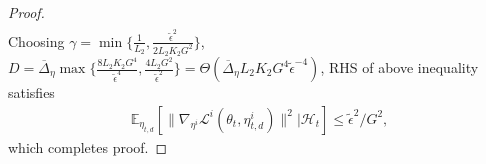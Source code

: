 \documentclass[twoside]{article} %
\theoremstyle{plain}
\theoremstyle{definition}
\theoremstyle{remark}
\newcommand{\tepsilon}{\tilde{\epsilon}}
\newcommand{\fL}{\mathcal{L}}
\newcommand{\calH}{\mathcal{H}}
\begin{document}
\begin{proof}
\begin{align}
\end{align}
Choosing $\gamma = \min\{\frac{1}{L_2},\frac{\tilde\epsilon^2}{2L_2K_2G^2}\}$, $D = \overline{\Delta}_{\eta}\max\{\frac{8L_2K_2G^4}{\tepsilon^{4}},\frac{4L_2G^2}{\tepsilon^2} \} = \Theta(\overline{\Delta}_{\eta}L_2K_2G^4\tepsilon^{-4})$, RHS of above inequality satisfies 
\begin{align}
\mathbb{E}_{\eta_{t,d}}[\|\nabla_{\eta^i} \fL^i({\theta}_t, {\eta}^i_{t,{d}}) \|^2|\calH_t]\leq {{\tepsilon^2}/{G^2}},
\end{align}
which completes proof.
\end{proof}
\end{document}
